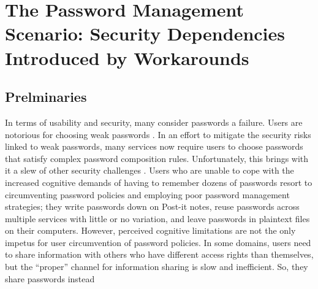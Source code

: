 \documentclass[conference]{IEEEtran}
\begin{document}
\section{The Password Management Scenario: Security Dependencies
  Introduced by Workarounds}
\label{password}

\subsection{Prelminaries}

In terms of usability and security, many consider passwords a failure. 
Users are notorious for choosing weak passwords 
\cite{spafford1992opus}. In an effort to mitigate the security risks 
linked to weak passwords, many services now require users to 
choose passwords that satisfy complex password composition rules. 
Unfortunately, this brings with it a slew of other security challenges 
\cite{blythe2013circumvention, florencio2014password, gaw2006password, adams1999users}. 
Users who are unable to cope with the increased cognitive demands 
of having to remember dozens of passwords resort to circumventing 
password policies and employing poor password management 
strategies; they write passwords down on Post-it notes, reuse 
passwords across multiple services with little or no variation, and 
leave passwords in plaintext files on their computers. However, 
perceived cognitive limitations are not the only impetus for user 
circumvention of password policies. In some domains, users need 
to share information with others who have different access rights 
than themselves, but the ``proper'' channel for information sharing 
is slow and inefficient. So, they share passwords instead 
\end{document}
